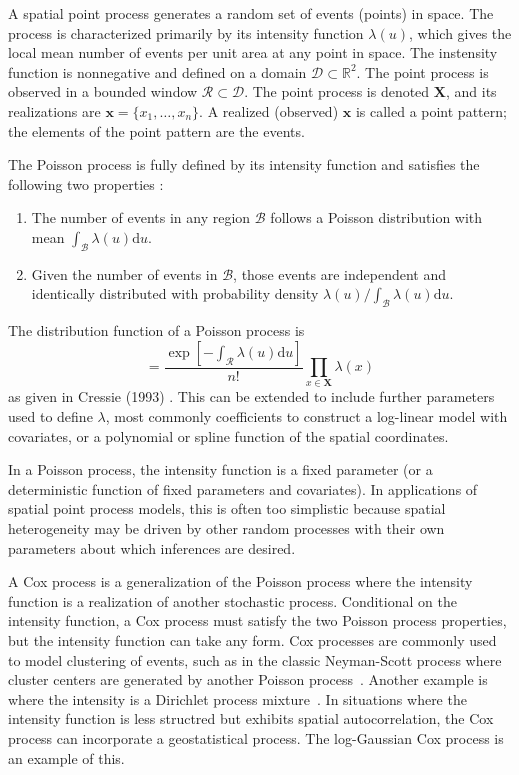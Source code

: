 \documentclass[]{interact}
\begin{document}
A spatial point process generates a random set of events (points) in space.
The process is characterized primarily by its intensity function
\(\lambda(u)\), which gives the local mean number of events per unit area at
any point in space. The instensity function is nonnegative and defined on a
domain \(\mathcal{D} \subset \mathbb{R}^{2}\). The point process is observed
in a bounded window \(\mathcal{R} \subset \mathcal{D}\). The point process is
denoted \(\mathbf{X}\), and its realizations are \(\mathbf{x} = \{x_{1},
\dots, x_{n}\}\). A realized (observed) \(\mathbf{x}\) is called a point
pattern; the elements of the point pattern are the events.

The Poisson process is fully defined by its intensity function and satisfies
the following two properties \cite{moellerwaagepetersen}:
\begin{enumerate}
\item The number of events in any region \(\mathcal{B}\) follows a Poisson
distribution with mean
\(\int_{\mathcal{B}} \lambda(u)\mathrm{d}u\).
\item Given the number of events in \(\mathcal{B}\), those events are
independent and identically distributed with probability density
\(\lambda(u) / \int_{\mathcal{B}} \lambda(u)\mathrm{d}u\).
\end{enumerate}
The distribution function of a Poisson process is
\begin{displaymath}
[\mathbf{X}|\lambda]
= \frac{\exp\left[-\int_{\mathcal{R}} \lambda(u) \mathrm{d}u\right]}
{n!} \prod_{x \in \mathbf{X}} \lambda(x)
\end{displaymath}
as given in Cressie (1993) \cite{cressie}. This can be extended to include
further parameters used to define \(\lambda\), most commonly coefficients
to construct a log-linear model with covariates, or a polynomial or spline
function of the spatial coordinates.

In a Poisson process, the intensity function is a fixed parameter (or a
deterministic function of fixed parameters and covariates). In applications of
spatial point process models, this is often too simplistic because spatial
heterogeneity may be driven by other random processes with their own parameters
about which inferences are desired.

A Cox process is a generalization of the Poisson process where the intensity
function is a realization of another stochastic process. Conditional on the
intensity function, a Cox process must satisfy the two Poisson process
properties, but the intensity function can take any form. Cox processes are
commonly used to model clustering of events, such as in the classic
Neyman-Scott process where cluster centers are generated by another Poisson
process~\cite{neymanscott}. Another example is where the intensity is a
Dirichlet process mixture~\cite{taddy}. In situations where the intensity
function is less structred but exhibits spatial autocorrelation, the Cox
process can incorporate a geostatistical process. The log-Gaussian Cox process
is an example of this.
\end{document}

